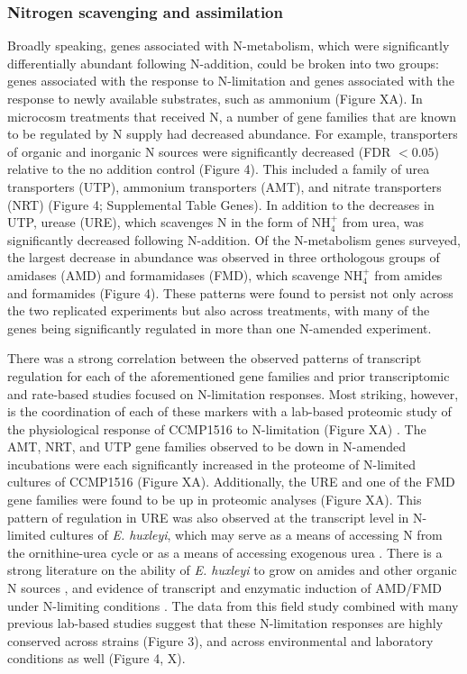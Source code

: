 \subsubsection{Nitrogen scavenging and assimilation}

Broadly speaking, genes associated with N-metabolism, which were significantly differentially abundant following N-addition, could be broken into two groups: genes associated with the response to N-limitation and genes associated with the response to newly available substrates, such as ammonium (Figure XA). In microcosm treatments that received N, a number of gene families that are known to be regulated by N supply had decreased abundance.  For example, transporters of organic and inorganic N sources were significantly decreased (FDR $< 0.05$) relative to the no addition control (Figure 4). This included a family of urea transporters (UTP), ammonium transporters (AMT), and nitrate transporters (NRT) (Figure 4; Supplemental Table Genes). In addition to the decreases in UTP, urease (URE), which scavenges N in the form of NH$_{4}^+$ from urea, was significantly decreased following N-addition. Of the N-metabolism genes surveyed, the largest decrease in abundance was observed in three orthologous groups of amidases (AMD) and formamidases (FMD), which scavenge NH$_{4}^+$ from amides and formamides (Figure 4). These patterns were found to persist not only across the two replicated experiments but also across treatments, with many of the genes being significantly regulated in more than one N-amended experiment. \par

There was a strong correlation between the observed patterns of transcript regulation for each of the aforementioned gene families and prior transcriptomic \citep{Rokitta2014} and rate-based \citep{Palenik1997, Bruhn2010} studies focused on N-limitation responses. Most striking, however, is the coordination of each of these markers with a lab-based proteomic study of the physiological response of CCMP1516 to N-limitation (Figure XA) \citep{McKew2015}. The AMT, NRT, and UTP gene families observed to be down in N-amended incubations were each significantly increased in the proteome of N-limited cultures of CCMP1516 (Figure XA).  Additionally, the URE and one of the FMD gene families were found to be up in proteomic analyses (Figure XA). This pattern of regulation in URE was also observed at the transcript level in N-limited cultures of \textit{E. huxleyi}, which may serve as a means of accessing N from the ornithine-urea cycle \citep{Rokitta2015} or as a means of accessing exogenous urea \citep{Dyhrman2003a}. There is a strong literature on the ability of \textit{E. huxleyi} to grow on amides and other organic N sources \citep{Palenik1997}, and evidence of transcript and enzymatic induction of AMD/FMD under N-limiting conditions \citep{Bruhn2010, Palenik1997}. The data from this field study combined with many previous lab-based studies suggest that these N-limitation responses are highly conserved across strains (Figure 3), and across environmental and laboratory conditions as well (Figure 4, X).\par

